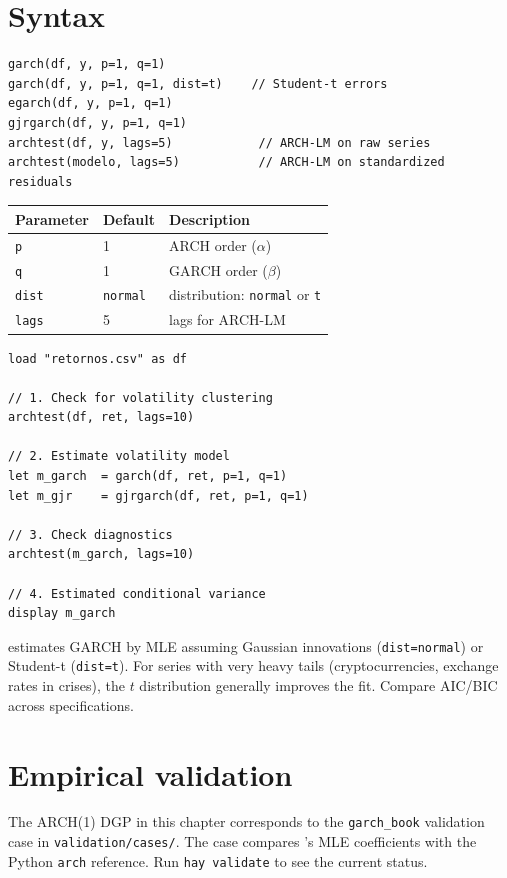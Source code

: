 \section{Syntax}

\begin{lstlisting}
garch(df, y, p=1, q=1)
garch(df, y, p=1, q=1, dist=t)    // Student-t errors
egarch(df, y, p=1, q=1)
gjrgarch(df, y, p=1, q=1)
archtest(df, y, lags=5)            // ARCH-LM on raw series
archtest(modelo, lags=5)           // ARCH-LM on standardized residuals
\end{lstlisting}

\begin{center}
\begin{tabular}{lll}
\toprule
\textbf{Parameter} & \textbf{Default} & \textbf{Description} \\
\midrule
\texttt{p}    & 1                & ARCH order ($\alpha$) \\
\texttt{q}    & 1                & GARCH order ($\beta$) \\
\texttt{dist} & \texttt{normal}  & distribution: \texttt{normal} or \texttt{t} \\
\texttt{lags} & 5                & lags for ARCH-LM \\
\bottomrule
\end{tabular}
\end{center}

\begin{lstlisting}[caption={Typical workflow — asset returns}]
load "retornos.csv" as df

// 1. Check for volatility clustering
archtest(df, ret, lags=10)

// 2. Estimate volatility model
let m_garch  = garch(df, ret, p=1, q=1)
let m_gjr    = gjrgarch(df, ret, p=1, q=1)

// 3. Check diagnostics
archtest(m_garch, lags=10)

// 4. Estimated conditional variance
display m_garch
\end{lstlisting}

\begin{nota}
  \hayashi{} estimates GARCH by MLE assuming Gaussian innovations
  (\lstinline{dist=normal}) or Student-t (\lstinline{dist=t}). For series
  with very heavy tails (cryptocurrencies, exchange rates in crises), the
  $t$ distribution generally improves the fit. Compare AIC/BIC across specifications.
\end{nota}

\section{Empirical validation}

The ARCH(1) DGP in this chapter corresponds to the \texttt{garch_book}
validation case in \texttt{validation/cases/}. The case compares \hayashi{}'s
MLE coefficients with the Python \texttt{arch} reference. Run
\lstinline{hay validate} to see the current status.
